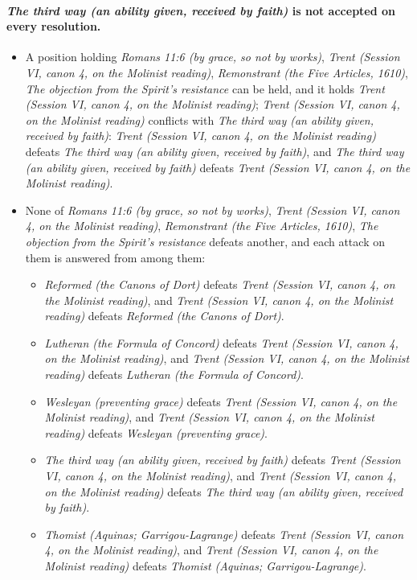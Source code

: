 \documentclass[11pt]{article}
\begin{document}
\paragraph{\emph{The third way (an ability given, received by faith)} is not accepted on every resolution.}
\begin{itemize}
\item A position holding \emph{Romans 11:6 (by grace, so not by works)}, \emph{Trent (Session VI, canon 4, on the Molinist reading)}, \emph{Remonstrant (the Five Articles, 1610)}, \emph{The objection from the Spirit’s resistance} can be held, and it holds \emph{Trent (Session VI, canon 4, on the Molinist reading)}; \emph{Trent (Session VI, canon 4, on the Molinist reading)} conflicts with \emph{The third way (an ability given, received by faith)}: \emph{Trent (Session VI, canon 4, on the Molinist reading)} defeats \emph{The third way (an ability given, received by faith)}, and \emph{The third way (an ability given, received by faith)} defeats \emph{Trent (Session VI, canon 4, on the Molinist reading)}.
\item None of \emph{Romans 11:6 (by grace, so not by works)}, \emph{Trent (Session VI, canon 4, on the Molinist reading)}, \emph{Remonstrant (the Five Articles, 1610)}, \emph{The objection from the Spirit’s resistance} defeats another, and each attack on them is answered from among them:
\begin{itemize}
\item \emph{Reformed (the Canons of Dort)} defeats \emph{Trent (Session VI, canon 4, on the Molinist reading)}, and \emph{Trent (Session VI, canon 4, on the Molinist reading)} defeats \emph{Reformed (the Canons of Dort)}.
\item \emph{Lutheran (the Formula of Concord)} defeats \emph{Trent (Session VI, canon 4, on the Molinist reading)}, and \emph{Trent (Session VI, canon 4, on the Molinist reading)} defeats \emph{Lutheran (the Formula of Concord)}.
\item \emph{Wesleyan (preventing grace)} defeats \emph{Trent (Session VI, canon 4, on the Molinist reading)}, and \emph{Trent (Session VI, canon 4, on the Molinist reading)} defeats \emph{Wesleyan (preventing grace)}.
\item \emph{The third way (an ability given, received by faith)} defeats \emph{Trent (Session VI, canon 4, on the Molinist reading)}, and \emph{Trent (Session VI, canon 4, on the Molinist reading)} defeats \emph{The third way (an ability given, received by faith)}.
\item \emph{Thomist (Aquinas; Garrigou-Lagrange)} defeats \emph{Trent (Session VI, canon 4, on the Molinist reading)}, and \emph{Trent (Session VI, canon 4, on the Molinist reading)} defeats \emph{Thomist (Aquinas; Garrigou-Lagrange)}.

\end{itemize}
\end{itemize}
\end{document}
